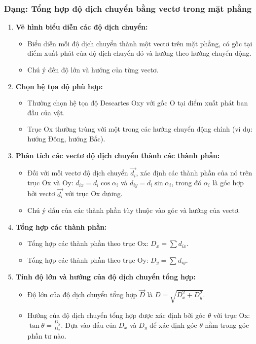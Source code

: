 \subsubsection{Dạng: Tổng hợp độ dịch chuyển bằng vectơ trong mặt phẳng}
\begin{phuongphap}
\begin{enumerate}
    \item \textbf{Vẽ hình biểu diễn các độ dịch chuyển:}
    \begin{itemize}
        \item Biểu diễn mỗi độ dịch chuyển thành một vectơ trên mặt phẳng, có gốc tại điểm xuất phát của độ dịch chuyển đó và hướng theo hướng chuyển động.
        \item Chú ý đến độ lớn và hướng của từng vectơ.
    \end{itemize}
    \item \textbf{Chọn hệ tọa độ phù hợp:}
    \begin{itemize}
        \item Thường chọn hệ tọa độ Descartes Oxy với gốc O tại điểm xuất phát ban đầu của vật.
        \item Trục Ox thường trùng với một trong các hướng chuyển động chính (ví dụ: hướng Đông, hướng Bắc).
    \end{itemize}
    \item \textbf{Phân tích các vectơ độ dịch chuyển thành các thành phần:}
    \begin{itemize}
        \item Đối với mỗi vectơ độ dịch chuyển $\vec{d_i}$, xác định các thành phần của nó trên trục Ox và Oy: $d_{ix} = d_i \cos \alpha_i$ và $d_{iy} = d_i \sin \alpha_i$, trong đó $\alpha_i$ là góc hợp bởi vectơ $\vec{d_i}$ với trục Ox dương.
        \item Chú ý dấu của các thành phần tùy thuộc vào góc và hướng của vectơ.
    \end{itemize}
    \item \textbf{Tổng hợp các thành phần:}
    \begin{itemize}
        \item Tổng hợp các thành phần theo trục Ox: $D_x = \sum d_{ix}$.
        \item Tổng hợp các thành phần theo trục Oy: $D_y = \sum d_{iy}$.
    \end{itemize}
    \item \textbf{Tính độ lớn và hướng của độ dịch chuyển tổng hợp:}
    \begin{itemize}
        \item Độ lớn của độ dịch chuyển tổng hợp $\vec{D}$ là $D = \sqrt{D_x^2 + D_y^2}$.
        \item Hướng của độ dịch chuyển tổng hợp được xác định bởi góc $\theta$ với trục Ox: $\tan \theta = \frac{D_y}{D_x}$. Dựa vào dấu của $D_x$ và $D_y$ để xác định góc $\theta$ nằm trong góc phần tư nào.
    \end{itemize}
\end{enumerate}
\end{phuongphap}
